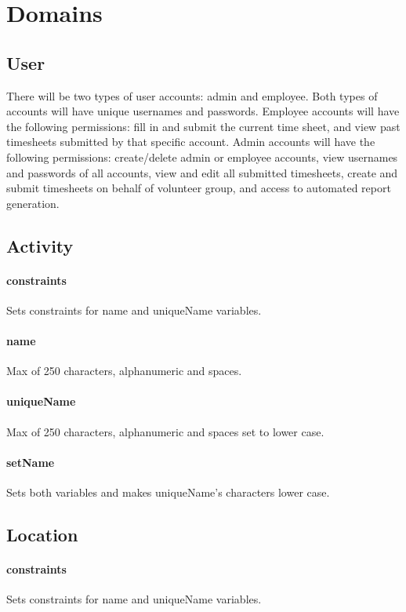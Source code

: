 \documentclass[12pt]{article}
\begin{document}
\section{Domains}\label{sec:Domains}
\subsection{User}\label{sec:DUser}
There will be two types of user accounts: admin and employee. Both types of accounts will have unique usernames and passwords. Employee accounts will have the following permissions: fill in and submit the current time sheet, and view past timesheets submitted by that specific account. Admin accounts will have the following permissions: create/delete admin or employee accounts, view usernames and passwords of all accounts, view and edit all submitted timesheets, create and submit timesheets on behalf of volunteer group, and access to automated report generation.

\setcounter{paragraph}{0}
\subsection{Activity}\label{sec:DActivity}
\paragraph{constraints} Sets constraints for name and uniqueName variables.
\paragraph{name} Max of 250 characters, alphanumeric and spaces.
\paragraph{uniqueName} Max of 250 characters, alphanumeric and spaces set to lower case.
\paragraph{setName} Sets both variables and makes uniqueName's characters lower case.

\setcounter{paragraph}{0}
\subsection{Location}\label{sec:DLocation}
\paragraph{constraints} Sets constraints for name and uniqueName variables.
\end{document}
